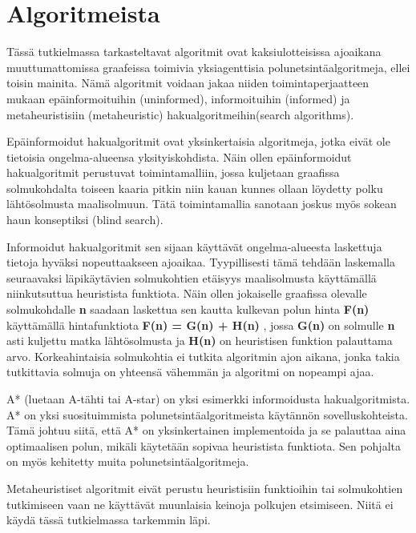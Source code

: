 \section{Algoritmeista}\label{algoritmeista}
Tässä tutkielmassa tarkasteltavat algoritmit ovat kaksiulotteisissa 
ajoaikana muuttumattomissa graafeissa toimivia yksiagenttisia 
polunetsintäalgoritmeja, ellei toisin mainita. Nämä algoritmit voidaan jakaa 
niiden toimintaperjaatteen mukaan epäinformoituihin (uninformed), 
informoituihin (informed) ja metaheuristisiin (metaheuristic) 
hakualgoritmeihin(search algorithms).\cite{applSciLawande}\par
	Epäinformoidut hakualgoritmit ovat yksinkertaisia algoritmeja, jotka 
eivät ole tietoisia ongelma-alueensa yksityiskohdista. Näin ollen 
epäinformoidut hakualgoritmit perustuvat toimintamalliin, jossa kuljetaan 
graafissa solmukohdalta toiseen kaaria pitkin niin kauan kunnes ollaan 
löydetty polku lähtösolmusta maalisolmuun. Tätä toimintamallia sanotaan 
joskus myös sokean haun konseptiksi (blind search).\cite{applSciLawande}\par
	Informoidut hakualgoritmit sen sijaan käyttävät ongelma-alueesta 
laskettuja tietoja hyväksi nopeuttaakseen ajoaikaa. Tyypillisesti tämä 
tehdään laskemalla seuraavaksi läpikäytävien solmukohtien etäisyys 
maalisolmusta käyttämällä niinkutsuttua heuristista funktiota. Näin ollen 
jokaiselle graafissa olevalle solmukohdalle \textbf{n} saadaan laskettua sen 
kautta kulkevan polun hinta \textbf{F(n)} käyttämällä hintafunktiota 
\textbf{F(n) = G(n) + H(n)} , jossa \textbf{G(n)} on solmulle \textbf{n} 
asti kuljettu matka lähtösolmusta ja \textbf{H(n)} on heuristisen funktion 
palauttama arvo. Korkeahintaisia solmukohtia ei tutkita algoritmin ajon 
aikana, jonka takia tutkittavia solmuja on yhteensä vähemmän ja algoritmi on 
nopeampi ajaa.\cite{applSciLawande}\par
	A* (luetaan A-tähti tai A-star) on yksi esimerkki informoidusta 
hakualgoritmista. A* on yksi suosituimmista polunetsintäalgoritmeista 
käytännön sovelluskohteista. Tämä johtuu siitä, että A* on yksinkertainen 
implementoida ja se palauttaa aina optimaalisen polun, mikäli käytetään 
sopivaa heuristista funktiota.\cite{MathewAndMalathy} Sen pohjalta on 
myös kehitetty muita polunetsintäalgoritmeja.\cite{applSciLawande}\par
	Metaheuristiset algoritmit eivät perustu heuristisiin funktioihin tai 
solmukohtien tutkimiseen vaan ne käyttävät muunlaisia keinoja polkujen 
etsimiseen.\cite{applSciLawande} Niitä ei käydä tässä tutkielmassa tarkemmin 
läpi.
\\
